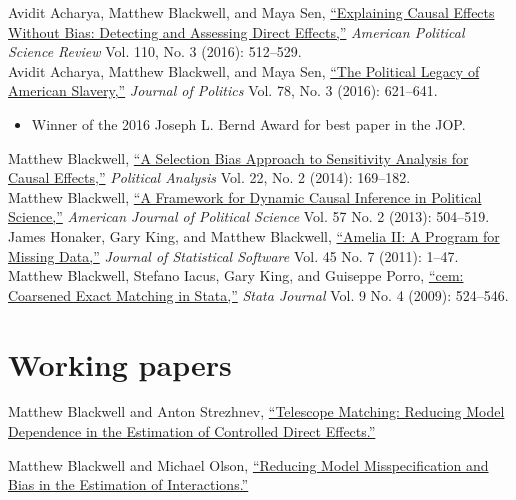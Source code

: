 \documentclass[margin,line,12pt]{res}
\begin{document}
\begin{resume}
Avidit Acharya, Matthew Blackwell, and Maya Sen, \href{http://www.mattblackwell.org/files/papers/direct-effects.pdf}{``Explaining Causal Effects Without Bias: Detecting and Assessing Direct Effects,''} \emph{American Political Science Review } Vol. 110, No. 3 (2016): 512--529.\vspace{1em}\\
Avidit Acharya, Matthew Blackwell, and Maya Sen, \href{http://www.mattblackwell.org/files/papers/slavery.pdf}{``The Political Legacy of American Slavery,''}   \emph{Journal of Politics }Vol. 78, No. 3 (2016): 621--641.
\begin{itemize}
\item Winner of the 2016 Joseph L. Bernd Award for best paper in the JOP.\end{itemize}
Matthew Blackwell, \href{http://gking.harvard.edu/files/sens.pdf}{``A Selection Bias Approach to Sensitivity
Analysis for Causal Effects,''} \emph{Political Analysis} Vol. 22, No. 2 (2014): 169--182.\vspace{1em}\\
Matthew Blackwell,
\href{http://mattblackwell.org/files/papers/dynci.pdf}{``A Framework
  for Dynamic Causal Inference in Political Science,''}
\emph{American Journal of Political Science} Vol. 57 No. 2 (2013): 504--519.\vspace{1em}\\
James Honaker, Gary King, and Matthew Blackwell, \href{http://www.mattblackwell.org/files/papers/amelia-jss.pdf}{``Amelia II: A
Program for Missing Data,''} \emph{Journal of Statistical Software}
Vol. 45 No. 7 (2011): 1--47.
\vspace{1em}\\
Matthew Blackwell, Stefano Iacus, Gary King, and Guiseppe Porro, \href{http://www.mattblackwell.org/files/papers/cemStata.pdf}{``cem: Coarsened Exact Matching in Stata,''} \emph{Stata
  Journal} Vol. 9 No. 4 (2009): 524--546. 

\section{\sc Working papers}


Matthew Blackwell and Anton Strezhnev, \href{https://mattblackwell.org/files/papers/telescope_matching.pdf}{``Telescope Matching: Reducing Model Dependence in the Estimation of Controlled Direct Effects.''} 

Matthew Blackwell and Michael Olson, \href{https://mattblackwell.org/files/papers/lasso-inters.pdf}{``Reducing Model Misspecification and Bias in the Estimation of Interactions.''} 


\end{resume}
\end{document}
